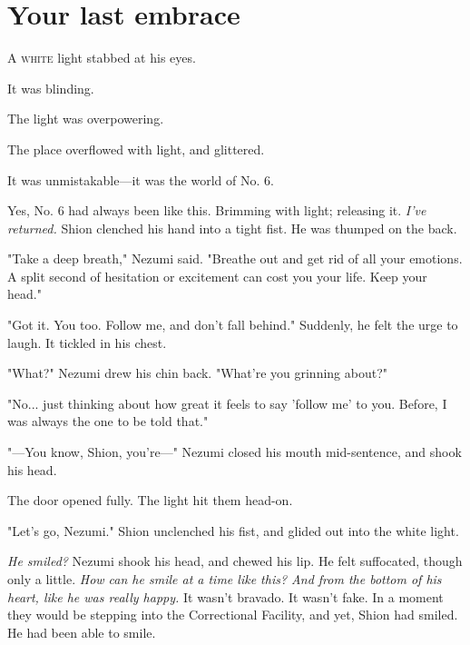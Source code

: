 
\chapter{Your last embrace}


\lettrine{A}{ white} light stabbed at his eyes.

It was blinding.

The light was overpowering.

The place overflowed with light, and glittered.

It was unmistakable---it was the world of No. 6.

\myspace

Yes, No. 6 had always been like this. Brimming with light; releasing it.
\emph{I've returned.} Shion clenched his hand into a tight fist. He was thumped
on the back.

"Take a deep breath," Nezumi said. "Breathe out and get rid of all your
emotions. A split second of hesitation or excitement can cost you your
life. Keep your head."

"Got it. You too. Follow me, and don't fall behind." Suddenly, he felt
the urge to laugh. It tickled in his chest.

"What?" Nezumi drew his chin back. "What're you grinning about?"

"No... just thinking about how great it feels to say 'follow me' to you.
Before, I was always the one to be told that."

"---You know, Shion, you're---" Nezumi closed his mouth mid-sentence, and
shook his head.

The door opened fully. The light hit them head-on.

"Let's go, Nezumi." Shion unclenched his fist, and glided out into the
white light.

\myspace

\emph{He smiled?} Nezumi shook his head, and chewed his lip. He felt
suffocated, though only a little. \emph{How can he smile at a time like this?
And from the bottom of his heart, like he was really happy.} It wasn't
bravado. It wasn't fake. In a moment they would be stepping into the
Correctional Facility, and yet, Shion had smiled. He had been able to
smile.

